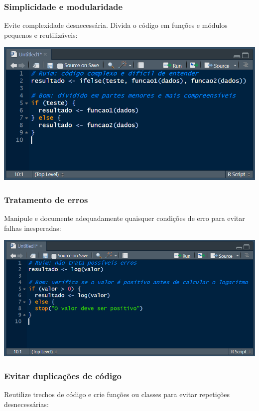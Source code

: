 \documentclass[
]{book}
\begin{document}
\subsubsection{Simplicidade e modularidade}\label{simplicidade-e-modularidade}

Evite complexidade desnecessária. Divida o código em funções e módulos pequenos e reutilizáveis:

\includegraphics{images/clipboard-1708113605.png}

\subsubsection{Tratamento de erros}\label{tratamento-de-erros}

Manipule e documente adequadamente quaisquer condições de erro para evitar falhas inesperadas:

\includegraphics{images/clipboard-2761045831.png}

\subsubsection{Evitar duplicações de código}\label{evitar-duplicauxe7uxf5es-de-cuxf3digo}

Reutilize trechos de código e crie funções ou classes para evitar repetições desnecessárias:
\end{document}
